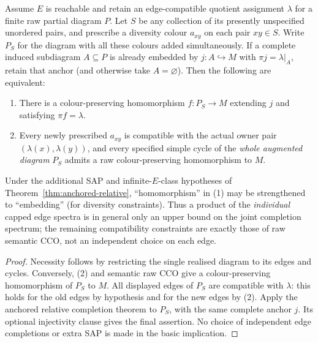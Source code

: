 \begin{proposition}
\label{prop:joint-owner-caps}
Assume $E$ is reachable and retain an edge-compatible quotient
assignment $\lambda$ for a finite raw partial diagram $P$.
Let $S$ be any collection of its presently unspecified unordered
pairs, and prescribe a diversity colour $a_{xy}$ on each pair
$xy\in S$.  Write $P_S$ for the diagram with all these colours
added simultaneously.  If a complete induced subdiagram
$A\subseteq P$ is already embedded by $j:A\hookrightarrow M$
with $\pi j=\lambda|_A$, retain that anchor (and otherwise take
$A=\varnothing$).
Then the following are equivalent:
\begin{enumerate}
\item There is a colour-preserving homomorphism
$f:P_S\to M$ extending $j$ and satisfying $\pi f=\lambda$.
\item Every newly prescribed $a_{xy}$ is compatible with the
actual owner pair $(\lambda(x),\lambda(y))$, and every
specified simple cycle of the \emph{whole augmented diagram}
$P_S$ admits a raw colour-preserving homomorphism to $M$.
\end{enumerate}
Under the additional SAP and infinite-$E$-class hypotheses of
Theorem~\ref{thm:anchored-relative}, ``homomorphism'' in (1)
may be strengthened to ``embedding'' (for diversity constraints).
Thus a product of the \emph{individual} capped edge spectra is
in general only an upper bound on the joint completion spectrum;
the remaining compatibility constraints are exactly those of raw
semantic CCO, not an independent choice on each edge.
\end{proposition}
\begin{proof}
Necessity follows by restricting the single realised diagram
to its edges and cycles.  Conversely, (2) and semantic raw CCO
give a colour-preserving homomorphism of $P_S$ to $M$.
All displayed edges of $P_S$ are compatible with $\lambda$:
this holds for the old edges by hypothesis and for the new
edges by (2).  Apply the anchored relative completion theorem
to $P_S$, with the same complete anchor $j$.  Its optional
injectivity clause gives the final assertion.  No choice of
independent edge completions or extra SAP is made in the basic
implication.
\end{proof}

